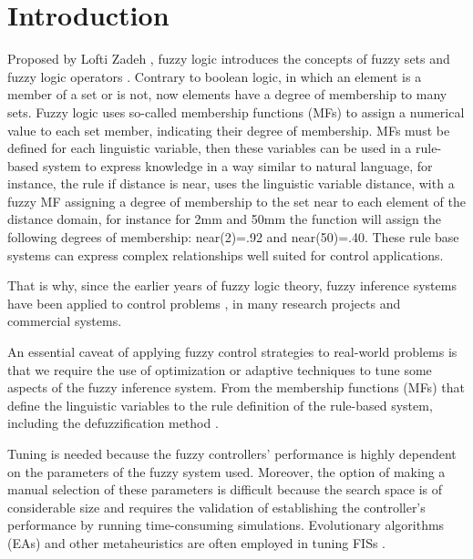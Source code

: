 \documentclass[symmetry,article,submit,moreauthors,pdftex]{Definitions/mdpi}
\begin{document}
\section{Introduction}

Proposed by Lofti Zadeh \cite{goguen_zadeh_1973}, fuzzy logic introduces the
concepts of fuzzy sets and fuzzy logic operators \cite{zadeh1996fuzzy}.
Contrary to boolean logic, in which an element is a member of a set or is not,
now elements have a degree of membership to many sets. Fuzzy logic uses
so-called membership functions (MFs) to assign a numerical value to each set
member, indicating their degree of membership. MFs must be defined for each
linguistic variable, then these variables can be used in a rule-based system to
express knowledge in a way similar to natural language, for instance, the rule
if distance is near, uses the linguistic variable distance, with a fuzzy MF
assigning a degree of membership to the set near to each element of the
distance domain, for instance for 2mm and 50mm the function will assign the
following degrees of membership: near(2)=.92 and near(50)=.40. These rule base
systems can express complex relationships well suited for control applications.  

That is why, since the earlier years of fuzzy logic theory, fuzzy inference
systems \cite{driankov_introduction_2013} have been applied to control problems
\cite{mamdani1974application,king1977application,passino1998fuzzy,driankov_introduction_2013},
in many research projects \cite{yang_improved_2003,driankov_fuzzy_2013} and
commercial systems.

An essential caveat of applying fuzzy control strategies to real-world problems
is that we require the use of optimization or adaptive techniques to tune some
aspects of the fuzzy inference system.  From the membership functions (MFs)
that define the linguistic variables to the rule definition of the rule-based
system, including the defuzzification method
\cite{xia2019command,isaka1988design}. 

Tuning is needed because the fuzzy controllers' performance is highly dependent
on the parameters of the fuzzy system used. Moreover, the option of making a
manual selection of these parameters is difficult because the search space is
of considerable size and requires the validation of establishing the
controller's performance by running time-consuming simulations.  Evolutionary
algorithms (EAs) and other metaheuristics are often employed in tuning FISs
\cite{martinez-soto_bio-inspired_2012}. 
\end{document}
